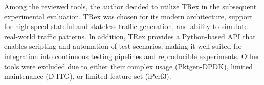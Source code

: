 Among the reviewed tools, the author decided to utilize TRex in the subsequent experimental evaluation.  
TRex was chosen for its modern architecture, support for high-speed stateful and stateless traffic generation, and ability to simulate real-world traffic patterns.  
In addition, TRex provides a Python-based API that enables scripting and automation of test scenarios, making it well-suited for integration into continuous testing pipelines and reproducible experiments.  
Other tools were excluded due to either their complex usage (Pktgen-DPDK), limited maintenance (D-ITG), or limited feature set (iPerf3).

